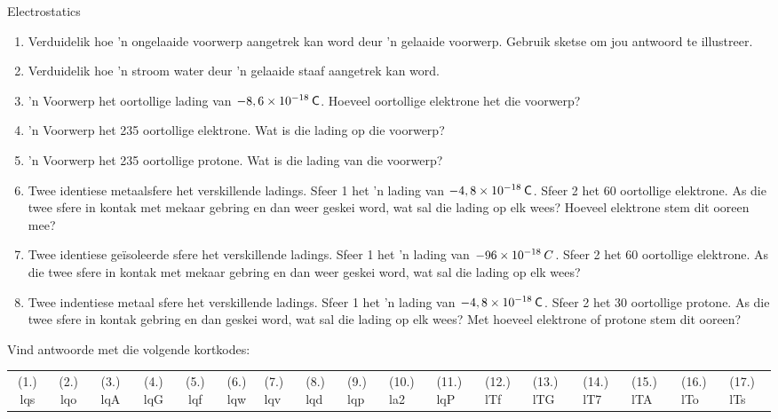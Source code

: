 \begin{eocexercises}{Electrostatics}
\begin{enumerate}[itemsep=5pt, label=\textbf{\arabic*}. ]
\item Verduidelik hoe 'n ongelaaide voorwerp aangetrek kan word deur 'n gelaaide voorwerp. Gebruik sketse om jou antwoord te illustreer. 

\item Verduidelik hoe 'n stroom water deur 'n gelaaide staaf aangetrek kan word.

\item 'n Voorwerp het oortollige lading van $-8,6\ensuremath{\times}{10}^{-18}\phantom{\rule{2pt}{0ex}}\mathsf{C}$. Hoeveel oortollige elektrone het die voorwerp?

\item 'n Voorwerp het 235 oortollige elektrone. Wat is die lading op die voorwerp? 

\item 'n Voorwerp het 235 oortollige protone. Wat is die lading van die voorwerp?

\item Twee identiese metaalsfere het verskillende ladings. Sfeer 1 het 'n lading van $-4,8\ensuremath{\times}{10}^{-18}\phantom{\rule{2pt}{0ex}}\mathsf{C}$. Sfeer 2 het 60 oortollige elektrone. As die twee sfere in kontak met mekaar gebring en dan weer geskei word, wat sal die lading op elk wees? Hoeveel elektrone stem dit ooreen mee?

\item Twee identiese ge\"isoleerde sfere het verskillende ladings. Sfeer 1 het 'n lading van $-96\ensuremath{\times}{10}^{-18}\phantom{\rule{2pt}{0ex}}C$. Sfeer 2 het 60 oortollige elektrone. As die twee sfere in kontak met mekaar gebring en dan weer geskei word, wat sal die lading op elk wees?

\item Twee indentiese metaal sfere het verskillende ladings. Sfeer 1 het 'n lading van $-4,8\ensuremath{\times}{10}^{-18}\phantom{\rule{2pt}{0ex}}\mathsf{C}$. Sfeer 2 het 30 oortollige protone. As die twee sfere in kontak gebring en dan geskei word, wat sal die lading op elk wees? Met hoeveel elektrone of protone stem dit ooreen?
            \end{enumerate}
  \label{m38781**end}
  \label{464e844ca5615087ea89d9d95dd9a43a**end}
\par {} Vind antwoorde met die volgende kortkodes:\par \begin{tabular}[h]{cccccc}
 (1.) lqs  &  (2.) lqo  &  (3.) lqA  &  (4.) lqG  &  (5.) lqf  &  (6.) lqw  &  (7.) lqv  &  (8.) lqd  &  (9.) lqp  &  (10.) la2  &  (11.) lqP  &  (12.) lTf  &  (13.) lTG  &  (14.) lT7  &  (15.) lTA  &  (16.) lTo  &  (17.) lTs  & \end{tabular}
\end{eocexercises}
